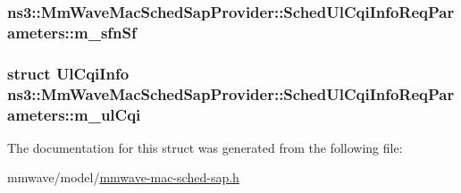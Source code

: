 \subsubsection[{\texorpdfstring{m\+\_\+sfn\+Sf}{m_sfnSf}}]{ ns3\+::\+Mm\+Wave\+Mac\+Sched\+Sap\+Provider\+::\+Sched\+Ul\+Cqi\+Info\+Req\+Parameters\+::m\+\_\+sfn\+Sf}\hypertarget{structns3_1_1MmWaveMacSchedSapProvider_1_1SchedUlCqiInfoReqParameters_aa9703cc72148cf9fe96838c6034c91dc}{}\label{structns3_1_1MmWaveMacSchedSapProvider_1_1SchedUlCqiInfoReqParameters_aa9703cc72148cf9fe96838c6034c91dc}
\subsubsection[{\texorpdfstring{m\+\_\+ul\+Cqi}{m_ulCqi}}]{\setlength{\rightskip}{0pt plus 5cm}struct {\bf Ul\+Cqi\+Info} ns3\+::\+Mm\+Wave\+Mac\+Sched\+Sap\+Provider\+::\+Sched\+Ul\+Cqi\+Info\+Req\+Parameters\+::m\+\_\+ul\+Cqi}\hypertarget{structns3_1_1MmWaveMacSchedSapProvider_1_1SchedUlCqiInfoReqParameters_ada0a21dc0e8ab004d54346e31c922ed1}{}\label{structns3_1_1MmWaveMacSchedSapProvider_1_1SchedUlCqiInfoReqParameters_ada0a21dc0e8ab004d54346e31c922ed1}


The documentation for this struct was generated from the following file\+:\begin{DoxyCompactItemize}
\item 
mmwave/model/\hyperlink{mmwave-mac-sched-sap_8h}{mmwave-\/mac-\/sched-\/sap.\+h}\end{DoxyCompactItemize}
